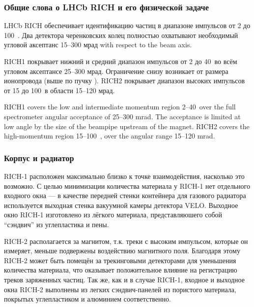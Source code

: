 \subsubsection{Общие слова о LHCb RICH и его физической задаче}

LHCb RICH обеспечивает идентификацию частиц в диапазоне импульсов от 2 до 100~\GeVoverC. Два детектора черенковских колец полностью охватывают необходимый угловой аксептанс 15--300 мрад with respect to the beam axis.

RICH1 покрывает нижний и средний диапазон импульсов от 2 до 40~\GeVoverC во всём угловом аксептансе 25--300 мрад. Ограничение снизу возникает от размера ионопровода (выше по пучку \todo). RICH2 покрывает диапазон высоких импульсов от 15 до 100~\GeVoverC в области 15--120 мрад.

RICH1 covers the low and intermediate momentum region 2–40~\GeVoverC over the full spectrometer angular acceptance of 25–300 mrad. The acceptance is limited at low angle by the size of the beampipe upstream of the magnet. RICH2 covers the high-momentum region 15–100~\GeVoverC, over the angular range 15–120 mrad.

\subsubsection{Корпус и радиатор}

\mbox{RICH-1} расположен максимально близко к точке взаимодействия, насколько это возможно. С целью минимизации количества материала у \mbox{RICH-1} нет отдельного входного окна --- в качестве передней стенки контейнера для газового радиатора используется выходная стенка вакуумной камеры детектора VELO. Выходное окно \mbox{RICH-1} изготовлено из лёгкого материала, представляюшего собой ``сэндвич'' из углепластика и пены.


\mbox{RICH-2} располагается за магнитом, т.к. треки с высоким импульсом, которые он измеряет, меньше подвержены воздействию магнитного поля. Благодаря этому \mbox{RICH-2} может быть помещён за трекинговыми детекторами для уменьшения количества материала, что оказывает положительное влияние на регистрацию треков заряженных частиц. Так же, как и в случае \mbox{RICH-1}, входное и выходное окна \mbox{RICH-2} выполнены из легких сэндвич-панелей из пористого материала, покрытых углепластиком и алюминием соответственно.

